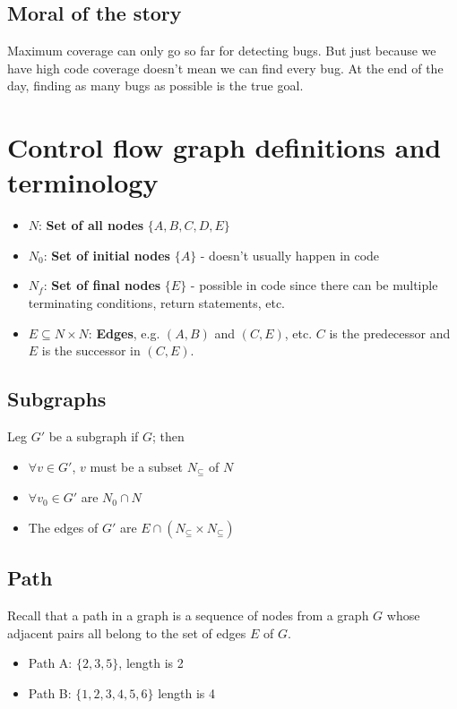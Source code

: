 \documentclass[12pt]{book}
\begin{document}
\subsection{Moral of the story}
Maximum coverage can only go so far for detecting bugs. But just because we have high code coverage doesn't mean we can find every bug. At the end of the day, finding as many bugs as possible is the true goal.

\section{Control flow graph definitions and terminology}

\begin{itemize}
  \item $N$: \textbf{Set of all nodes} $\{A,B,C,D,E\}$
  \item $N_0$: \textbf{Set of initial nodes} $\{A\}$ - doesn't usually happen in code
  \item $N_f$: \textbf{Set of final nodes} $\{E\}$ - possible in code since there can be multiple terminating conditions, return statements, etc.
  \item $E\subseteq N\times N$: \textbf{Edges}, e.g. $(A,B)$ and $(C,E)$, etc. $C$ is the predecessor and $E$ is the successor in $(C,E)$.
\end{itemize}

\subsection{Subgraphs}

Leg $G'$ be a subgraph if $G$; then
\begin{itemize}
  \item $\forall v\in G'$, $v$ must be a subset $N_{\subseteq}$ of $N$
  \item $\forall v_0\in G'$ are $N_0 \cap N$
  \item The edges of $G'$ are $E\cap (N_{\subseteq}\times N_{\subseteq})$
\end{itemize}

\subsection{Path}

Recall that a path in a graph is a sequence of nodes from a graph $G$ whose adjacent pairs all belong to the set of edges $E$ of $G$.

\begin{itemize}
  \item Path A: $\{2,3,5\}$, length is 2
  \item Path B: $\{1,2,3,4,5,6\}$ length is 4
\end{itemize}
\end{document}
